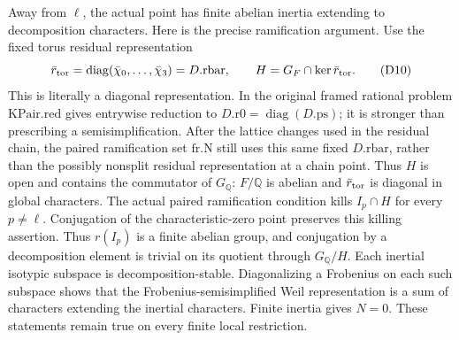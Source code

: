 Away from \(\ell\), the actual point has finite abelian
inertia extending to decomposition characters.
Here is the precise ramification argument.
Use the fixed torus residual representation
\[
 \bar r_{\rm tor}
       =\operatorname{diag}(\bar\chi_0,\ldots,\bar\chi_3)
       =D.\mathrm{rbar},\qquad
                       H=G_F\cap\ker\bar r_{\rm tor}.
 \tag{D10}
\]
This is literally a diagonal representation.
In the original framed rational problem
\(\mathrm{KPair.red}\) gives entrywise reduction to
\(D.\mathrm{r0}=\operatorname{diag}(D.\mathrm{ps})\);
it is stronger than prescribing a semisimplification.
After the lattice changes used in the residual chain,
the paired ramification set \(\mathrm{fr.N}\) still uses
this same fixed \(D.\mathrm{rbar}\), rather than the
possibly nonsplit residual representation at a chain point.
Thus \(H\) is open and contains the commutator of
\(G_{\mathbb Q}\): \(F/\mathbb Q\) is abelian and
\(\bar r_{\rm tor}\) is diagonal in global characters.
The actual paired ramification condition kills
\(I_p\cap H\) for every \(p\ne\ell\).
Conjugation of the characteristic-zero point preserves
this killing assertion.
Thus \(r(I_p)\) is a finite abelian group, and conjugation
by a decomposition element is trivial on its quotient
through \(G_{\mathbb Q}/H\).
Each inertial isotypic subspace is decomposition-stable.
Diagonalizing a Frobenius on each such subspace shows
that the Frobenius-semisimplified Weil representation is
a sum of characters extending the inertial characters.
Finite inertia gives \(N=0\).
These statements remain true on every finite local
restriction.

